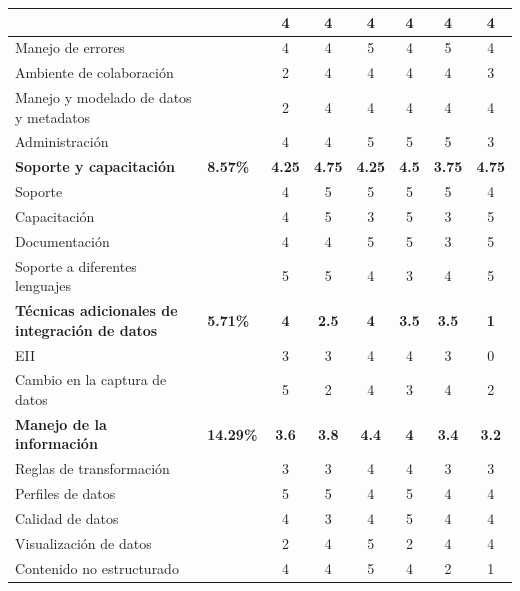 \begin{table}[htbp]
\begin{center}
{\begin{tabular}{|p{5.5cm}|>{\centering\arraybackslash}m{1.7cm}|c|c|c|c|c|c|}
        & & 4 & 4 & 4 & 4 & 4 & 4 \\
        \hline
        Manejo de errores & & 4 & 4 & 5 & 4 & 5 & 4\\
        \hline
        Ambiente de colaboración & & 2 & 4 & 4 & 4 & 4 & 3\\
        \hline
        Manejo y modelado de datos y metadatos & & 2 & 4 & 4 & 4 & 4 & 4 \\
        \hline
        Administración & & 4 & 4 & 5 & 5 & 5 & 3\\
        \hline
        \rowcolor[gray]{0.9}\textbf{Soporte y capacitación}
        & \textbf{8.57\%}
        & \textbf{4.25}
        & \textbf{4.75}
        & \textbf{4.25}
        & \textbf{4.5}
        & \textbf{3.75}
        & \textbf{4.75}\\
        \hline
        Soporte & & 4 & 5 & 5 & 5 & 5 & 4 \\
        \hline
        Capacitación & & 4 & 5 & 3 & 5 & 3 & 5 \\
        \hline
        Documentación & & 4 & 4 & 5 & 5 & 3 & 5 \\
        \hline
        Soporte a diferentes lenguajes & & 5 & 5 & 4 & 3 & 4 & 5 \\
        \hline
        \rowcolor[gray]{0.9}\textbf{Técnicas adicionales de integración de
        datos}
        & \textbf{5.71\%}
        &\textbf{ 4}
        & \textbf{2.5}
        & \textbf{4}
        & \textbf{3.5}
        & \textbf{3.5} & \textbf{1} \\
        \hline
        EII & & 3 & 3 & 4 & 4 & 3 & 0 \\
        \hline
        Cambio en la captura de datos & & 5 & 2 & 4 & 3 & 4 & 2 \\
        \hline
        \rowcolor[gray]{0.9}\textbf{Manejo de la información}
        & \textbf{14.29\%}
        & \textbf{3.6}
        & \textbf{3.8}
        & \textbf{4.4}
        & \textbf{4}
        & \textbf{3.4}
        & \textbf{3.2} \\
        \hline
        Reglas de transformación & & 3 & 3 & 4 & 4 & 3 & 3 \\
        \hline
        Perfiles de datos & & 5 & 5 & 4 & 5 & 4 & 4 \\
        \hline
        Calidad de datos & & 4 & 3 & 4 & 5 & 4 & 4 \\
        \hline
        Visualización de datos & & 2 & 4 & 5 & 2 & 4 & 4 \\
        \hline
        Contenido no estructurado & & 4 & 4 & 5 & 4 & 2 & 1 \\

\end{tabular}}
\end{center}
\end{table}
